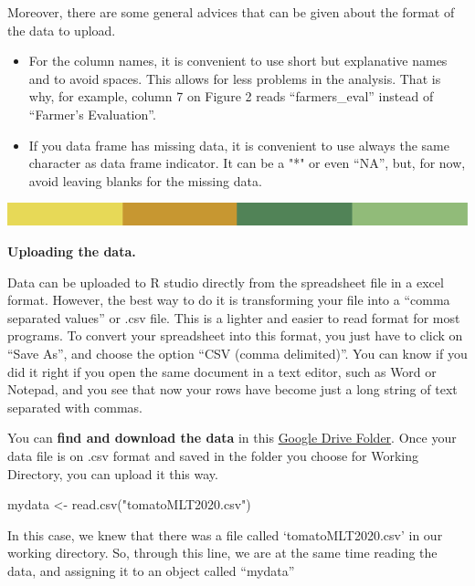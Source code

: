 \documentclass[
]{book}
\newenvironment{Shaded}{\begin{snugshade}}{\end{snugshade}}
\newcommand{\FunctionTok}[1]{\textcolor[rgb]{0.00,0.00,0.00}{#1}}
\newcommand{\NormalTok}[1]{#1}
\newcommand{\OtherTok}[1]{\textcolor[rgb]{0.56,0.35,0.01}{#1}}
\newcommand{\StringTok}[1]{\textcolor[rgb]{0.31,0.60,0.02}{#1}}
\begin{document}
Moreover, there are some general advices that can be given about the format of the data to upload.

\begin{itemize}
\item
  For the column names, it is convenient to use short but explanative names and to avoid spaces. This allows for less problems in the analysis. That is why, for example, column 7 on Figure 2 reads ``farmers\_eval'' instead of ``Farmer's Evaluation''.
\item
  If you data frame has missing data, it is convenient to use always the same character as data frame indicator. It can be a "*" or even ``NA'', but, for now, avoid leaving blanks for the missing data.
\end{itemize}

\includegraphics{rsrstrip.png}

\textbf{Uploading the data.}

Data can be uploaded to R studio directly from the spreadsheet file in a excel format. However, the best way to do it is transforming your file into a ``comma separated values'' or .csv file. This is a lighter and easier to read format for most programs. To convert your spreadsheet into this format, you just have to click on ``Save As'', and choose the option ``CSV (comma delimited)''. You can know if you did it right if you open the same document in a text editor, such as Word or Notepad, and you see that now your rows have become just a long string of text separated with commas.

You can \textbf{find and download the data} in this \href{https://drive.google.com/drive/folders/1y2NPXd9lYZcM51NMJEgqa-Iax8qZYs3O?usp=sharing}{Google Drive Folder}. Once your data file is on .csv format and saved in the folder you choose for Working Directory, you can upload it this way.

\begin{Shaded}
\begin{Highlighting}[]
\NormalTok{mydata }\OtherTok{\textless{}{-}} \FunctionTok{read.csv}\NormalTok{(}\StringTok{"tomatoMLT2020.csv"}\NormalTok{)}
\end{Highlighting}
\end{Shaded}

In this case, we knew that there was a file called `tomatoMLT2020.csv' in our working directory. So, through this line, we are at the same time reading the data, and assigning it to an object called ``mydata''
\end{document}
